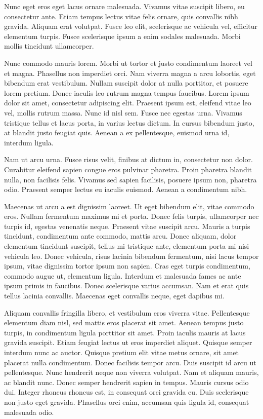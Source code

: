 Nunc eget eros eget lacus ornare malesuada. Vivamus vitae suscipit libero, eu consectetur ante. Etiam tempus lectus vitae felis ornare, quis convallis nibh gravida. Aliquam erat volutpat. Fusce leo elit, scelerisque ac vehicula vel, efficitur elementum turpis. Fusce scelerisque ipsum a enim sodales malesuada. Morbi mollis tincidunt ullamcorper.

Nunc commodo mauris lorem. Morbi ut tortor et justo condimentum laoreet vel et magna. Phasellus non imperdiet orci. Nam viverra magna a arcu lobortis, eget bibendum erat vestibulum. Nullam suscipit dolor at nulla porttitor, et posuere lorem pretium. Donec iaculis leo rutrum magna tempus faucibus. Lorem ipsum dolor sit amet, consectetur adipiscing elit. Praesent ipsum est, eleifend vitae leo vel, mollis rutrum massa. Nunc id nisl sem. Fusce nec egestas urna. Vivamus tristique tellus et lacus porta, in varius lectus dictum. In cursus bibendum justo, at blandit justo feugiat quis. Aenean a ex pellentesque, euismod urna id, interdum ligula.

Nam ut arcu urna. Fusce risus velit, finibus at dictum in, consectetur non dolor. Curabitur eleifend sapien congue eros pulvinar pharetra. Proin pharetra blandit nulla, non facilisis felis. Vivamus sed sapien facilisis, posuere ipsum non, pharetra odio. Praesent semper lectus eu iaculis euismod. Aenean a condimentum nibh.

Maecenas ut arcu a est dignissim laoreet. Ut eget bibendum elit, vitae commodo eros. Nullam fermentum maximus mi et porta. Donec felis turpis, ullamcorper nec turpis id, egestas venenatis neque. Praesent vitae suscipit arcu. Mauris a turpis tincidunt, condimentum ante commodo, mattis arcu. Donec aliquam, dolor elementum tincidunt suscipit, tellus mi tristique ante, elementum porta mi nisi vehicula leo. Donec vehicula, risus lacinia bibendum fermentum, nisi lacus tempor ipsum, vitae dignissim tortor ipsum non sapien. Cras eget turpis condimentum, commodo augue ut, elementum ligula. Interdum et malesuada fames ac ante ipsum primis in faucibus. Donec scelerisque varius accumsan. Nam et erat quis tellus lacinia convallis. Maecenas eget convallis neque, eget dapibus mi.

Aliquam convallis fringilla libero, et vestibulum eros viverra vitae. Pellentesque elementum diam nisl, sed mattis eros placerat sit amet. Aenean tempus justo turpis, in condimentum ligula porttitor sit amet. Proin iaculis mauris at lacus gravida suscipit. Etiam feugiat lectus ut eros imperdiet aliquet. Quisque semper interdum nunc ac auctor. Quisque pretium elit vitae metus ornare, sit amet placerat nulla condimentum. Donec facilisis tempor arcu. Duis suscipit id arcu ut pellentesque. Nunc hendrerit neque non viverra volutpat. Nam et aliquam mauris, ac blandit nunc. Donec semper hendrerit sapien in tempus. Mauris cursus odio dui. Integer rhoncus rhoncus est, in consequat orci gravida eu. Duis scelerisque non justo eget gravida. Phasellus orci enim, accumsan quis ligula id, consequat malesuada odio.

